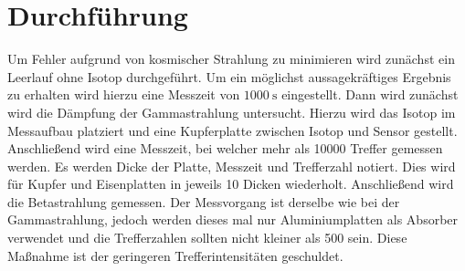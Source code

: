 
\section{Durchführung}
\label{sec:Durchführung}
Um Fehler aufgrund von kosmischer Strahlung zu minimieren wird zunächst ein Leerlauf ohne Isotop durchgeführt.
 Um ein möglichst aussagekräftiges Ergebnis zu erhalten wird hierzu eine Messzeit von $\SI{1000}{\second}$ eingestellt.
Dann wird zunächst wird die Dämpfung der Gammastrahlung untersucht. Hierzu wird
das Isotop im Messaufbau platziert und eine Kupferplatte zwischen Isotop und Sensor gestellt.
 Anschließend wird eine Messzeit, bei welcher mehr als 10000 Treffer gemessen werden. Es werden
 Dicke der Platte, Messzeit und Trefferzahl notiert. Dies wird für Kupfer und Eisenplatten in jeweils 10 Dicken wiederholt.
 Anschließend wird die Betastrahlung gemessen. Der Messvorgang ist derselbe wie
 bei der Gammastrahlung, jedoch werden dieses mal nur Aluminiumplatten als Absorber
 verwendet und die Trefferzahlen sollten nicht kleiner als 500 sein. Diese Maßnahme
 ist der geringeren Trefferintensitäten geschuldet. 
